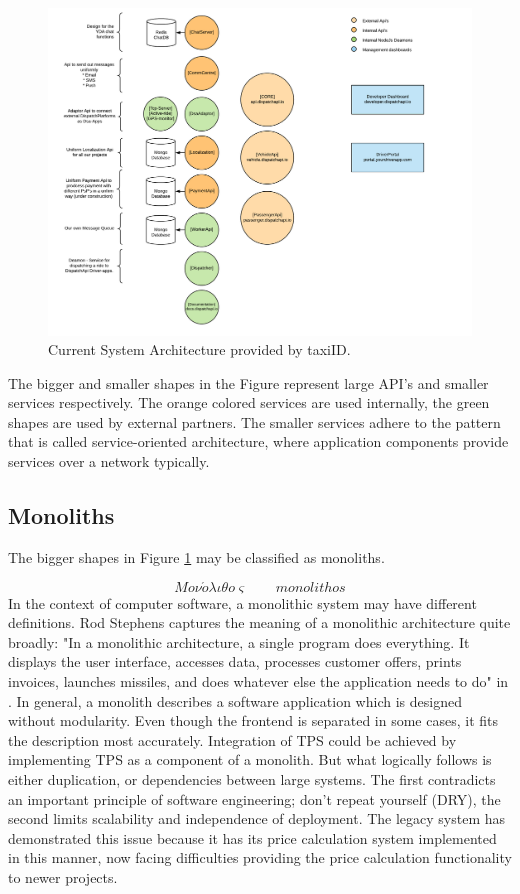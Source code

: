 \begin{figure}[H]
	\centering
	\includegraphics[width=1\textwidth]{Architecture}
	\caption[Current System Architecture]{Current System Architecture provided by taxiID.}
	\label{fig:Architecture}
\end{figure}

The bigger and smaller shapes in the Figure represent large API's and smaller services respectively. The orange colored services are used internally, the green shapes are used by external partners. The smaller services adhere to the pattern that is called service-oriented architecture, where application components provide services over a network typically.

\subsection{Monoliths}
The bigger shapes in Figure \ref{fig:Architecture} may be classified as monoliths.

\[Mo \nu \acute{o} \lambda \iota \theta o \varsigma \qquad monolithos\]
In the context of computer software, a monolithic system may have different definitions. Rod Stephens captures the meaning of a monolithic architecture quite broadly: "In a monolithic architecture, a single program does everything. It displays the user interface, accesses data, processes customer offers, prints invoices, launches missiles, and does whatever else the application needs to do" in \cite{rod-BSE}. In general, a monolith describes a software application which is designed without modularity. Even though the frontend is separated in some cases, it fits the description most accurately. Integration of TPS could be achieved by implementing TPS as a component of a monolith. But what logically follows is either duplication, or dependencies between large systems. The first contradicts an important principle of software engineering; don't repeat yourself (DRY), the second limits scalability and independence of deployment. The legacy system has demonstrated this issue because it has its price calculation system implemented in this manner, now facing difficulties providing the price calculation functionality to newer projects.

